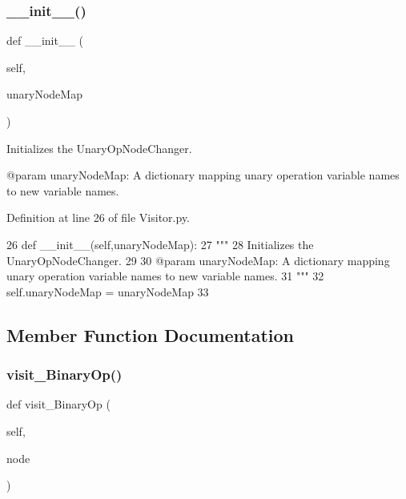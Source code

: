 \subsubsection{\texorpdfstring{\+\_\+\+\_\+init\+\_\+\+\_\+()}{\_\_init\_\_()}}
{\footnotesize\ttfamily def \+\_\+\+\_\+init\+\_\+\+\_\+ (\begin{DoxyParamCaption}\item[{}]{self,  }\item[{}]{unary\+Node\+Map }\end{DoxyParamCaption})}

\begin{DoxyVerb}Initializes the UnaryOpNodeChanger.

@param unaryNodeMap: A dictionary mapping unary operation variable names to new variable names.
\end{DoxyVerb}
 

Definition at line 26 of file Visitor.\+py.


\begin{DoxyCode}
26     \textcolor{keyword}{def }\_\_init\_\_(self,unaryNodeMap):
27         \textcolor{stringliteral}{"""
}
28 \textcolor{stringliteral}{        Initializes the UnaryOpNodeChanger.
}
29 \textcolor{stringliteral}{
}
30 \textcolor{stringliteral}{        @param unaryNodeMap: A dictionary mapping unary operation variable names to new variable names.
}
31 \textcolor{stringliteral}{        """}
32         self.unaryNodeMap = unaryNodeMap
33     
\end{DoxyCode}


\subsection{Member Function Documentation}
\mbox{\label{classPostProcessor_1_1Visitor_1_1UnaryOpNodeChanger_a6329fbf13e2d22de5384fbca843113b8}} 
\subsubsection{\texorpdfstring{visit\+\_\+\+Binary\+Op()}{visit\_BinaryOp()}}
{\footnotesize\ttfamily def visit\+\_\+\+Binary\+Op (\begin{DoxyParamCaption}\item[{}]{self,  }\item[{}]{node }\end{DoxyParamCaption})}


